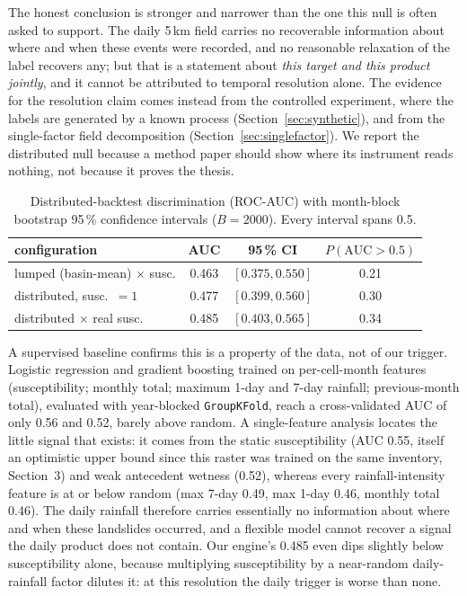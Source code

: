 \documentclass[authoryear,preprint,review,12pt]{elsarticle}
\begin{document}
The honest conclusion is stronger and narrower than the one this null is often
asked to support. The daily 5\,km field carries no recoverable information about
where and when these events were recorded, and no reasonable relaxation of the
label recovers any; but that is a statement about \emph{this target and this
product jointly}, and it cannot be attributed to temporal resolution alone. The
evidence for the resolution claim comes instead from the controlled experiment,
where the labels are generated by a known process (Section~\ref{sec:synthetic}),
and from the single-factor field decomposition
(Section~\ref{sec:singlefactor}). We report the distributed null because a method
paper should show where its instrument reads nothing, not because it proves the
thesis.

\begin{table}[ht]
\centering
\caption{Distributed-backtest discrimination (ROC-AUC) with month-block
bootstrap 95\,\% confidence intervals ($B=2000$). Every interval spans 0.5.}
\label{tab:auc}
\begin{tabular}{@{}lccc@{}}
\toprule
configuration & AUC & 95\,\% CI & $P(\mathrm{AUC}>0.5)$ \\
\midrule
lumped (basin-mean) $\times$ susc. & 0.463 & $[0.375, 0.550]$ & 0.21 \\
distributed, susc.\ $=1$           & 0.477 & $[0.399, 0.560]$ & 0.30 \\
distributed $\times$ real susc.    & 0.485 & $[0.403, 0.565]$ & 0.34 \\
\bottomrule
\end{tabular}
\end{table}

A supervised baseline confirms this is a property of the data, not of our
trigger. Logistic regression and gradient boosting trained on per-cell-month
features (susceptibility; monthly total; maximum 1-day and 7-day rainfall;
previous-month total), evaluated with year-blocked \texttt{GroupKFold}, reach a
cross-validated AUC of only 0.56 and 0.52, barely above random. A single-feature
analysis locates the little signal that exists: it comes from the static
susceptibility (AUC 0.55, itself an optimistic upper bound since this raster was
trained on the same inventory, Section~3) and weak antecedent wetness (0.52),
whereas every rainfall-intensity feature is at or below random (max 7-day 0.49,
max 1-day 0.46, monthly total 0.46). The daily rainfall therefore carries essentially no
information about where and when these landslides occurred, and a flexible model
cannot recover a signal the daily product does not contain. Our engine's 0.485
even dips slightly below susceptibility alone, because multiplying susceptibility
by a near-random daily-rainfall factor dilutes it: at this resolution the daily
trigger is worse than none.
\end{document}
